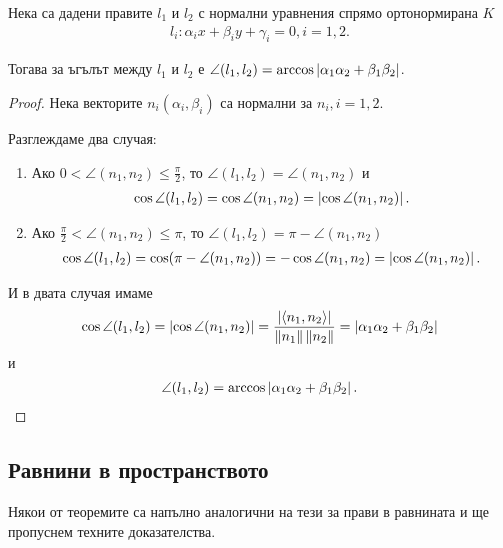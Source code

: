 \documentclass[numbers=endperiod, bibliography=totocnumbered]{scrartcl}
\begin{document}
\begin{theorem}
  Нека са дадени правите \( l_1 \) и \( l_2 \) с нормални уравнения спрямо ортонормирана \( K \)
  \begin{align*}
    l_i: \alpha_i x + \beta_i y + \gamma_i = 0, i = 1, 2.
  \end{align*}

  Тогава за ъгълът между \( l_1 \) и \( l_2 \) е \( \angle(l_1, l_2) = \arccos \left\vert \alpha_1 \alpha_2 + \beta_1 \beta_2 \right\vert \).
\end{theorem}
\begin{proof}
  Нека векторите \( n_i(\alpha_i, \beta_i) \) са нормални за \( n_i, i = 1, 2 \).

  Разглеждаме два случая:
  \begin{enumerate}
    \item Ако \( 0 < \angle(n_1, n_2) \leq \frac {\pi} 2 \), то \( \angle(l_1, l_2) = \angle(n_1, n_2) \) и
    \begin{align*}
      \cos \angle (l_1, l_2)
      =
      \cos \angle(n_1, n_2)
      =
      \left\vert \cos \angle (n_1, n_2) \right\vert.
    \end{align*}

    \item Ако \( \frac {\pi} 2 < \angle(n_1, n_2) \leq \pi \), то \( \angle(l_1, l_2) = \pi - \angle(n_1, n_2) \)
    \begin{align*}
      \cos \angle (l_1, l_2)
      =
      \cos (\pi - \angle(n_1, n_2))
      =
      -\cos \angle(n_1, n_2)
      =
      \left\vert \cos \angle (n_1, n_2) \right\vert.
    \end{align*}
  \end{enumerate}

  И в двата случая имаме
  \begin{align*}
    \cos \angle(l_1, l_2)
    =
    \left\vert \cos \angle(n_1, n_2) \right\vert
    =
    \frac {\left\vert \left\langle n_1, n_2 \right\rangle \right\vert} {\left\Vert n_1 \right\Vert \left\Vert n_2 \right\Vert}
    =
    \left\vert \alpha_1 \alpha_2 + \beta_1 \beta_2 \right\vert
  \end{align*}
  и
  \begin{align*}
    \angle(l_1, l_2)
    =
    \arccos \left\vert \alpha_1 \alpha_2 + \beta_1 \beta_2 \right\vert.
  \end{align*}
\end{proof}

\subsection{Равнини в пространството}

\begin{remark}
  Някои от теоремите са напълно аналогични на тези за прави в равнината и ще пропуснем техните доказателства.
\end{remark}
\end{document}
